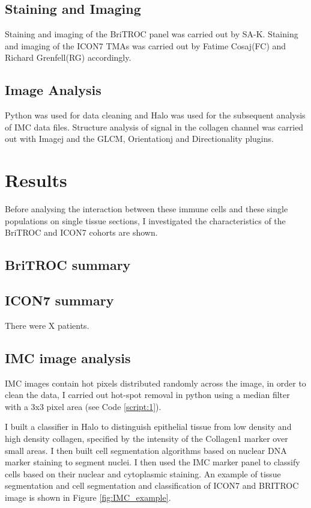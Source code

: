 \subsection{Staining and Imaging}
Staining and imaging of the BriTROC panel was carried out by SA-K. Staining and imaging of the ICON7 TMAs was carried out by Fatime Cosaj(FC) and Richard Grenfell(RG) accordingly.

\subsection{Image Analysis}
Python was used for data cleaning and Halo was used for the subsequent analysis of IMC data files. Structure analysis of signal in the collagen channel was carried out with Imagej and the GLCM, Orientationj and Directionality plugins. 


\section{Results}
Before analysing the interaction between these immune cells and these single populations on single tissue sections, I investigated the characteristics of the BriTROC and ICON7 cohorts are shown.

\subsection{BriTROC summary}
\subsection{ICON7 summary}
There were X patients.

\subsection{IMC image analysis}
 IMC images contain hot pixels distributed randomly across the image, in order to clean the data, I carried out hot-spot removal in python using a median filter with a 3x3 pixel area (see Code \ref{script:1}).
 
 I built a classifier in Halo to distinguish epithelial tissue from low density and high density collagen, specified by the intensity of the Collagen1 marker over small areas.
 I then built cell segmentation algorithms based on nuclear DNA marker staining to segment nuclei. I then used the IMC marker panel to classify cells based on their nuclear and cytoplasmic staining. An example of tissue segmentation and cell segmentation and classification of ICON7 and BRITROC image is shown in Figure \ref{fig:IMC_example}.
 
